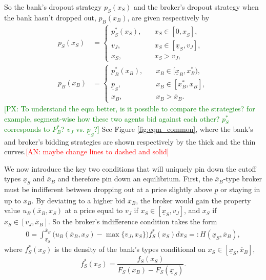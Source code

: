\documentclass[11pt,twopage]{article}
\newcommand{\AN}[1]{\textcolor{red}{[AN: #1]}}
\newcommand{\PX}[1]{\textcolor{green}{[PX: #1]}}
\newcommand{\ol}{\overline}
\newcommand{\ul}{\underline}
\begin{document}
So the bank's dropout strategy $p_S(x_S)$ and the broker's dropout
strategy when the bank hasn't dropped out, $p_B(x_B)$, are given
respectively by
\begin{align}
  p_S(x_S) & =
  \begin{cases}
    p_S^*(x_S), & \quad x_S \in [0, \underline x_S], \\
    v_J,        & \quad x_S\in[\underline x_S,v_J],\\
    x_S , & \quad x_S>v_J,
  \end{cases} \nonumber \\
  p_B(x_B) & =
  \begin{cases}
    p_B^*(x_B), & \quad x_B \in [\underline x_B, x_B^*), \\
    \ul p_S,        & \quad x_B\in[x_B^*,\overline x_B] ,\\
    x_B , & \quad x_B>\overline x_B.
  \end{cases}
  \label{eq:strategies}
\end{align}
\PX{To understand the eqm better, is it possible to compare the strategies? for example, segment-wise how these two agents bid against each other? $p^*_S$ corresponds to $P^*_B$? $v_J$ vs. $\underline{p}_S$?}
See Figure \ref{fig:eqm_common}, where the bank's and broker's bidding
strategies are shown respectively by the thick and the thin
curves.\AN{maybe change lines to dashed and solid}



We now introduce the key two conditions that will uniquely pin down
the cutoff types $\underline x_S$ and $\ol x_B$ and therefore pin down
an equilibrium.  First, the $\ol x_B$-type broker must be indifferent
between dropping out at a price slightly above $\ul p$ or staying in
up to $\ol x_B$. By deviating to a higher bid $\ol x_B$, the broker
would gain the property value $u_B(\ol x_B,x_S)$ at a price equal to
$v_J$ if $x_S \in [\underline x_S,v_J]$, and $x_S$ if $x_S \in
[v_J,\ol x_B]$. So the broker's indifference condition takes the form
\begin{align}
  0 = \int_{\underline x_S}^{\ol x_B} \Big( u_B(\ol x_B,x_S)- \max \{
  v_J , x_S \}\Big) f_S^*(x_S)d x_S =: H(\underline x_S,\ol
  x_B), \label{eq:bindif0}
\end{align}
where $f_S^*(x_S)$ is the density of the bank's types conditional on
$x_S \in [\ul x_S,\ol x_B]$,
\[ f_S^*(x_S) = \frac{f_S(x_S)}{F_S(\overline x_B)-F_S(\underline
  x_S)}.\]
\end{document}
